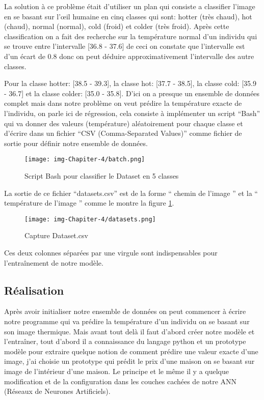 \documentclass[12pt]{article}
\begin{document}
La solution à ce problème était d’utiliser un plan qui consiste a classifier l’image en se basant sur l’œil humaine en cinq classes qui sont: hotter (très chaud), hot (chaud), normal (normal), cold (froid) et colder (très froid). Après cette classification on a fait des recherche sur la température normal d’un individu qui se trouve entre l’intervalle [36.8 - 37.6] de ceci on constate que l’intervalle est d’un écart de 0.8 donc on peut déduire approximativement l’intervalle des autre classes.

Pour la classe hotter: [38.5 - 39.3], la classe hot: [37.7 - 38.5], la classe cold: [35.9 - 36.7] et la classe colder: [35.0 - 35.8]. D’ici on a presque un ensemble de données complet mais dans notre problème on veut prédire la température exacte de l’individu, on parle ici de régression, cela consiste à implémenter un script “Bash” qui va donner des valeurs (température) aléatoirement pour chaque classe et d’écrire dans un fichier “CSV (Comma-Separated Values)” comme fichier de sortie pour définir notre ensemble de données.
\newpage
\begin{figure}[h]
	\centering
	\texttt{[image: img-Chapiter-4/batch.png]}
	\caption{Script Bash pour classifier le Dataset en 5 classes}
\end{figure}

La sortie de ce fichier “datasets.csv” est de la forme “ chemin de l’image ” et la “ température de l’image ” comme le montre la figure \ref{fig:dataset.csv}.
\newpage

\begin{figure}[h]
	\centering
	\texttt{[image: img-Chapiter-4/datasets.png]}
	\caption{Capture Dataset.csv}
	\label{fig:dataset.csv}
\end{figure}

Ces deux colonnes séparées par une virgule sont indispensables pour l’entraînement de notre modèle.

\subsection{Réalisation}
Après avoir initialiser notre ensemble de données on peut commencer à écrire notre programme qui va prédire la température d’un individu on se basant sur son image thermique. Mais avant tout delà il faut d’abord créer notre modèle et l’entraîner, tout d’abord il a  connaissance du langage python et un prototype modèle pour extraire quelque notion de comment prédire une valeur exacte d’une image, j’ai choisie un prototype qui prédit le prix d’une maison on se basant sur image de l'intérieur d’une maison. Le principe et le même il y a quelque modification et de la configuration dans les couches cachées de notre ANN (Réseaux de Neurones Artificiels).
\end{document}
